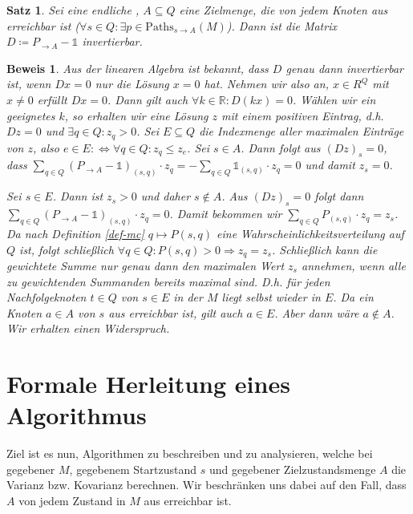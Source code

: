 \documentclass[a4paper]{article}
\newtheorem{satz}{Satz}[section] %
\theoremstyle{nonumberplain}
\newtheorem{beweis}{Beweis}
\begin{document}
\begin{satz}\label{th-unique}
	Sei \mcex{} eine endliche \mc, $A\subseteq Q$ eine Zielmenge, die von jedem Knoten aus erreichbar ist ($\forall s\in Q: \exists p \in \mathrm{Paths}_{s\rightarrow A}(M)$). 
	Dann ist die Matrix $D \coloneqq P_{\rightarrow A} - \mathbb{1}$ invertierbar.
\end{satz}
\begin{beweis}
	Aus der linearen Algebra ist bekannt, dass $D$ genau dann invertierbar ist, wenn $Dx = 0$ nur die Lösung $x=0$ hat.
	Nehmen wir also an, $x \in R^Q$ mit $x\neq 0$ erfüllt $Dx = 0$. Dann gilt auch $\forall k \in \mathbb{R}: D (kx) = 0$. Wählen wir ein geeignetes $k$, so erhalten wir eine Lösung $z$ mit einem positiven Eintrag, d.h. $Dz = 0$ und $\exists q \in Q : z_q > 0$. Sei $E \subseteq Q$ die Indexmenge aller maximalen Einträge von $z$, also $e \in E :\Leftrightarrow \forall q \in Q : z_q \leq z_e$. Sei $s\in A$. Dann folgt aus $(Dz)_s = 0$, dass $\sum_{q\in Q}{(P_{\rightarrow A}- \mathbb{1})_{(s,q)} \cdot z_q} = -\sum_{q\in Q}{\mathbb{1}_{(s,q)} \cdot z_q} = 0$  und damit $z_s = 0$.
	
	Sei $s \in E$. Dann ist $z_s > 0$ und daher $s\notin A$. Aus $(Dz)_s = 0$ folgt dann $\sum_{q\in Q}{(P_{\rightarrow A}- \mathbb{1})_{(s,q)} \cdot z_q} = 0$. Damit bekommen wir $\sum_{q\in Q}{P_{(s,q)} \cdot z_q} = z_s$. Da nach Definition \ref{def-mc} $q \mapsto P(s,q)$ eine Wahrscheinlichkeitsverteilung auf $Q$ ist, folgt schließlich $\forall q\in Q: P(s,q) > 0 \Rightarrow z_q = z_s$. Schließlich kann die gewichtete Summe nur genau dann den maximalen Wert $z_s$ annehmen, wenn alle zu gewichtenden Summanden bereits maximal sind. D.h. für jeden Nachfolgeknoten $t\in Q$ von $s\in E$ in der \mc{} $M$ liegt selbst wieder in $E$. Da ein Knoten $a\in A$ von $s$ aus erreichbar ist, gilt auch $a\in E$. Aber dann wäre $a\notin A$. Wir erhalten einen Widerspruch.
\end{beweis}


\section{Formale Herleitung eines Algorithmus}

Ziel ist es nun, Algorithmen zu beschreiben und zu analysieren, welche bei gegebener \mc{} $M$, gegebenem Startzustand $s$ und gegebener Zielzustandsmenge $A$ die Varianz bzw. Kovarianz berechnen. Wir beschränken uns dabei auf den Fall, dass $A$ von jedem Zustand in $M$ aus erreichbar ist.
\end{document}
